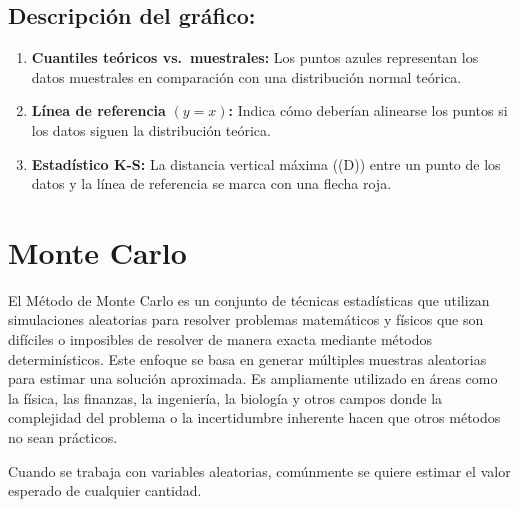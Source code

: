 \documentclass[
  us-letterpaper,
]{scrreprt}
\providecommand{\tightlist}{%
  \setlength{\itemsep}{0pt}\setlength{\parskip}{0pt}}\usepackage{longtable,booktabs,array}
\theoremstyle{plain}
\theoremstyle{plain}
\theoremstyle{definition}
\theoremstyle{remark}
\begin{document}
\begin{tcolorbox}
\subsection{Descripción del
gráfico:}\label{descripciuxf3n-del-gruxe1fico}

\begin{enumerate}
\def\labelenumi{\arabic{enumi}.}
\tightlist
\item
  \textbf{Cuantiles teóricos vs.~muestrales:} Los puntos azules
  representan los datos muestrales en comparación con una distribución
  normal teórica.
\item
  \textbf{Línea de referencia} \((y=x)\)\textbf{:} Indica cómo deberían
  alinearse los puntos si los datos siguen la distribución teórica.
\item
  \textbf{Estadístico K-S:} La distancia vertical máxima ((D)) entre un
  punto de los datos y la línea de referencia se marca con una flecha
  roja.
\end{enumerate}

\end{tcolorbox}

\section{Monte Carlo}\label{sec-Mon_Car}

El Método de Monte Carlo es un conjunto de técnicas estadísticas que
utilizan simulaciones aleatorias para resolver problemas matemáticos y
físicos que son difíciles o imposibles de resolver de manera exacta
mediante métodos determinísticos. Este enfoque se basa en generar
múltiples muestras aleatorias para estimar una solución aproximada. Es
ampliamente utilizado en áreas como la física, las finanzas, la
ingeniería, la biología y otros campos donde la complejidad del problema
o la incertidumbre inherente hacen que otros métodos no sean prácticos.

Cuando se trabaja con variables aleatorias, comúnmente se quiere estimar
el valor esperado de cualquier cantidad.
\end{document}
